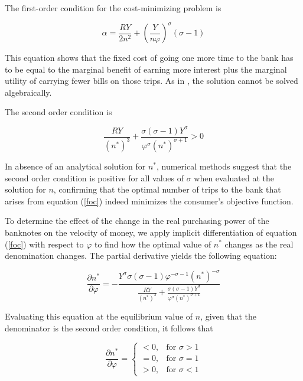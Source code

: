 \documentclass[12pt]{article}
\begin{document}
The first-order condition for the cost-minimizing problem is 

\begin{equation}
    \alpha = \frac{RY}{2n^2} + \left(\frac{Y}{n\varphi}\right)^\sigma (\sigma - 1)
    \label{foc}
\end{equation}

This equation shows that the fixed cost of going one more time to the bank has to be equal to the marginal benefit of earning more interest plus the marginal utility of carrying fewer bills on those trips. As in \cite{Benati2021}, the solution cannot be solved algebraically.

The second order condition is 

\begin{equation}
    \frac{RY}{(n^*)^3} + \frac{\sigma (\sigma - 1) Y^\sigma}{\varphi^\sigma (n^*)^{\sigma+1}}  > 0
    \label{soc}
\end{equation}

In absence of an analytical solution for $n^*$, numerical methods suggest that the second order condition is positive for all values of $\sigma$ when evaluated at the solution for $n$, confirming that the optimal number of trips to the bank that arises from equation (\ref{foc}) indeed minimizes the consumer's objective function.

To determine the effect of the change in the real purchasing power of the banknotes on the velocity of money, we apply implicit differentiation of equation (\ref{foc}) with respect to $\varphi$ to find how the optimal value of $n^*$ changes as the real denomination changes. The partial derivative yields the following equation:

\begin{equation}
    \frac{\partial n^*}{\partial \varphi} = - \frac{Y^\sigma \sigma (\sigma - 1) \varphi^{-\sigma - 1} (n^*)^{-\sigma}}{\frac{RY}{(n^*)^3} + \frac{\sigma (\sigma - 1) Y^\sigma}{\varphi^\sigma (n^*)^{\sigma+1}}}
\end{equation}

Evaluating this equation at the equilibrium value of $n$, given that the denominator is the second order condition, it follows that

\begin{equation*}
    \frac{\partial n^*}{\partial \varphi} = \left\{\begin{array}{lr}
        < 0, & \text{for } \sigma > 1\\
        = 0, & \text{for } \sigma = 1\\
        > 0, & \text{for }\sigma < 1
        \end{array} \right.
\end{equation*}
\end{document}
